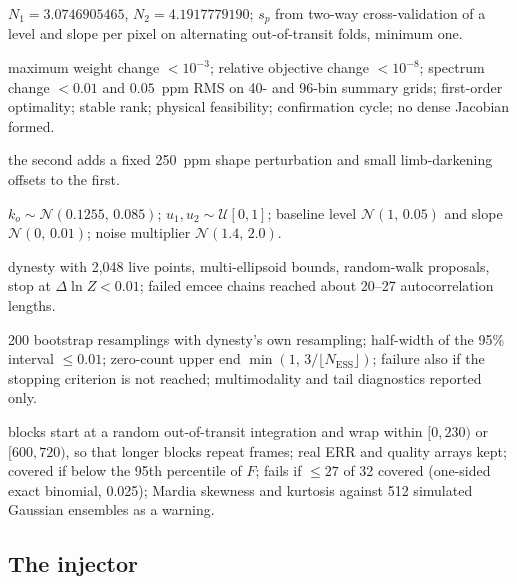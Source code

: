 {\begin{description}[font=\normalfont\itshape,leftmargin=0pt,itemsep=0pt,topsep=2pt]
  \item[Uncertainty scales.] $N_1=3.0746905465$, $N_2=4.1917779190$; $s_p$ from two-way cross-validation of a level and slope per pixel on alternating out-of-transit folds, minimum one.
  \item[Closure.] maximum weight change $<10^{-3}$; relative objective change $<10^{-8}$; spectrum change $<0.01$ and $0.05$~ppm RMS on 40- and 96-bin summary grids; first-order optimality; stable rank; physical feasibility; confirmation cycle; no dense Jacobian formed.
  \item[Starts.] the second adds a fixed 250~ppm shape perturbation and small limb-darkening offsets to the first.
  \item[White-light priors.] $k_o\sim\mathcal N(0.1255,\,0.085)$; $u_1,u_2\sim\mathcal U[0,1]$; baseline level $\mathcal N(1,\,0.05)$ and slope $\mathcal N(0,\,0.01)$; noise multiplier $\mathcal N(1.4,\,2.0)$.
  \item[White-light sampler.] dynesty with 2{,}048 live points, multi-ellipsoid bounds, random-walk proposals, stop at $\Delta\ln Z<0.01$; failed emcee chains reached about 20--27 autocorrelation lengths.
  \item[Grazing mass.] 200 bootstrap resamplings with dynesty's own resampling; half-width of the 95\% interval $\leq0.01$; zero-count upper end $\min(1,\,3/\lfloor N_{\mathrm{ESS}}\rfloor)$; failure also if the stopping criterion is not reached; multimodality and tail diagnostics reported only.
  \item[Ensemble.] blocks start at a random out-of-transit integration and wrap within $[0,230)$ or $[600,720)$, so that longer blocks repeat frames; real ERR and quality arrays kept; covered if below the 95th percentile of $F$; fails if $\leq27$ of 32 covered (one-sided exact binomial, 0.025); Mardia skewness and kurtosis against 512 simulated Gaussian ensembles as a warning.
\end{description}
}

\subsection{The injector}
\label{app:injector}

